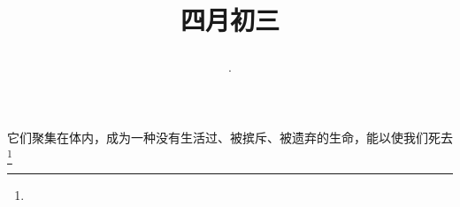 \title{\date[d=10,m=5,y=2024][year:cn-y,年,month:cn,day:cn,日,·,weekday]·四月初三 }
它们聚集在体内，成为一种没有生活过、被摈斥、被遗弃的生命，能以使我们死去\footnote{ }

